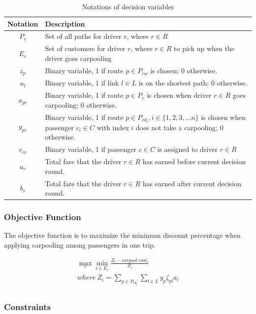 \begin{table}[ht]
  \centering
  \caption{Notations of decision variables}
  \begin{tabularx}{\textwidth}{cX}
  \toprule
  Notation & Description \\
  \midrule
    $P_r$ & Set of all paths for driver $r$, where $r \in R$ \\
    $E_r$ & Set of customers for driver $r$, where $r \in R$ to pick up when the driver goes carpooling \\
    $z_p$ & Binary variable, 1 if route $p \in P_{rw}$ is chosen; 0 otherwise. \\
    $u_l$ & Binary variable, 1 if link $l \in L$ is on the shortest path; 0 otherwise. \\
    $x_{pr}$ & Binary variable, 1 if route $p \in P_r$ is chosen when driver $r \in R$ goes carpooling; 0 otherwise. \\
    $y_{pr}$ & Binary variable, 1 if route $p \in P_{rd_i}, i \in \{1,2,3,...n\}$ is chosen when passenger $c_i \in C$ with index $i$ does not take a carpooling; 0 otherwise. \\
    $v_{cr}$ & Binary variable, 1 if passenger $c \in C$ is assigned to driver $r \in R$ \\
    $a_r$ & Total fare that the driver $r \in R$ has earned before current decision round. \\
    $b_r$ & Total fare that the driver $r \in R$ has earned after current decision round. \\
  \bottomrule
  \end{tabularx}
\end{table}  
\newpage

\subsubsection*{Objective Function}

The objective function is to maximize the minimum discount percentage when applying carpooling among passengers in one trip.

\begin{align*}
  \max_{r} \min_{i \in E_r} \frac{Z_i - carpool\ cost_i}{Z_i} \tag{IP1} \\
  where\ Z_i = \sum_{p \in P_{rd_i}} \sum_{l \in L} y_p \zeta_{pl} a_l \\
\end{align*}

\subsubsection*{Constraints}

